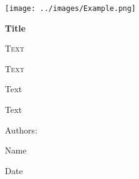 \begin{titlepage}
    \centering
    \texttt{[image: ../images/Example.png]}\par
    \vspace{1cm}
    {\bfseries\LARGE Title\par}
    \vspace{0.5cm}
    {\scshape\Large Text\par}
    \vspace{2cm}
    {\scshape\Huge Text\par}
    \vspace{2cm}
    {\Huge Text\par}
    {\Large Text\par}
    \vfill
    {\Large Authors: \par}
    {\Large Name\par}
    \vfill
    {\Large Date\par}
\end{titlepage}
